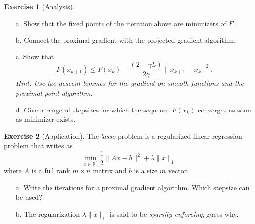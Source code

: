 \documentclass[a4paper,twoside,10pt]{amsart}
\numberwithin{equation}{section} %
\numberwithin{figure}{section} %
\numberwithin{table}{section} %
\theoremstyle{definition}
\newtheorem{q_td}{Exercise }
\begin{document}
\begin{q_td}[Analysis]
\label{td:ana}\hfill


\begin{itemize}
\item[a.] Show that the fixed points of the iteration above are minimizers of $F$.
\item[b.] Connect the proximal gradient with the projected gradient algorithm.
\item[c.] Show that
$$ F(x_{k+1}) \leq F(x_k) - \frac{(2-\gamma L)}{2\gamma} \|x_{k+1}  - x_k \|^2 . $$ 
\emph{\small Hint: Use the descent lemmas for the gradient on smooth functions and the proximal point algorithm.}
\item[d.] Give a range of stepsizes for which the sequence $F(x_k)$ converges as soon as minimizer exists.
\end{itemize}
\end{q_td}


\vspace*{0.5cm}

\begin{q_td}[Application]
\label{td:app}
The \emph{lasso} problem is a regularized linear regression problem that writes as 
$$ \min_{x\in\mathbb{R}^n } \frac{1}{2}\|Ax-b\|^2 + \lambda \|x\|_1  $$
where $A$ is a full rank $m\times n$ matrix and $b$ is a size $m$ vector.
\begin{itemize}
\item[a.] Write the iterations for a proximal gradient algorithm. Which stepsize can be used?
\item[b.] The regularization $\lambda \|x\|_1$ is said to be \emph{sparsity enforcing}, guess why.
\end{itemize}
\end{q_td}
\end{document}
